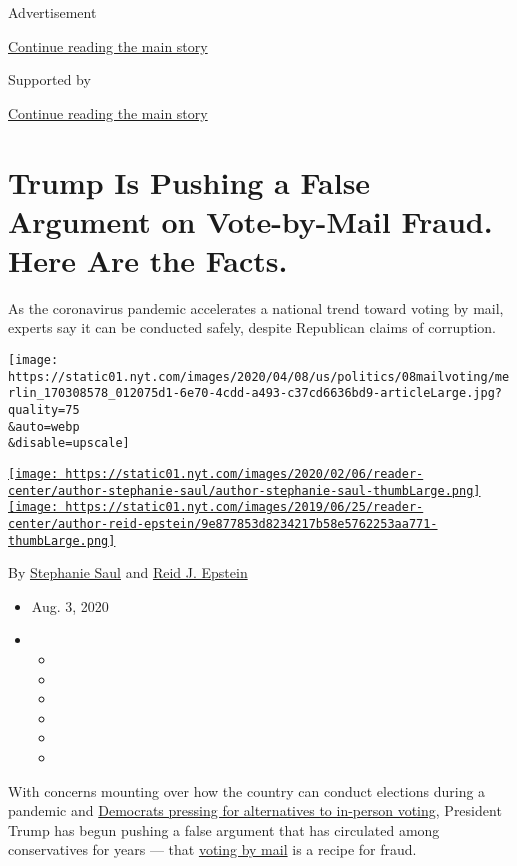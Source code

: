 Advertisement

\protect\hyperlink{after-top}{Continue reading the main story}

Supported by

\protect\hyperlink{after-sponsor}{Continue reading the main story}

\hypertarget{trump-is-pushing-a-false-argument-on-vote-by-mail-fraud-here-are-the-facts}{%
\section{Trump Is Pushing a False Argument on Vote-by-Mail Fraud. Here
Are the
Facts.}\label{trump-is-pushing-a-false-argument-on-vote-by-mail-fraud-here-are-the-facts}}

As the coronavirus pandemic accelerates a national trend toward voting
by mail, experts say it can be conducted safely, despite Republican
claims of corruption.

\texttt{[image: https://static01.nyt.com/images/2020/04/08/us/politics/08mailvoting/merlin\_170308578\_012075d1-6e70-4cdd-a493-c37cd6636bd9-articleLarge.jpg?quality=75\\\&auto=webp\\\&disable=upscale]}

\href{https://www.nytimes.com/by/stephanie-saul}{\texttt{[image: https://static01.nyt.com/images/2020/02/06/reader-center/author-stephanie-saul/author-stephanie-saul-thumbLarge.png]}}\href{https://www.nytimes.com/by/reid-j-epstein}{\texttt{[image: https://static01.nyt.com/images/2019/06/25/reader-center/author-reid-epstein/9e877853d8234217b58e5762253aa771-thumbLarge.png]}}

By \href{https://www.nytimes.com/by/stephanie-saul}{Stephanie Saul} and
\href{https://www.nytimes.com/by/reid-j-epstein}{Reid J. Epstein}

\begin{itemize}
\item
  Aug. 3, 2020
\item
  \begin{itemize}
  \item
  \item
  \item
  \item
  \item
  \item
  \end{itemize}
\end{itemize}

With concerns mounting over how the country can conduct elections during
a pandemic and
\href{https://www.nytimes.com/2020/04/08/us/politics/democrats-coronavirus-voting.html}{Democrats
pressing for alternatives to in-person voting}, President Trump has
begun pushing a false argument that has circulated among conservatives
for years --- that
\href{https://www.nytimes.com/2020/08/03/us/politics/trump-mail-in-voting.html}{voting
by mail} is a recipe for fraud.

